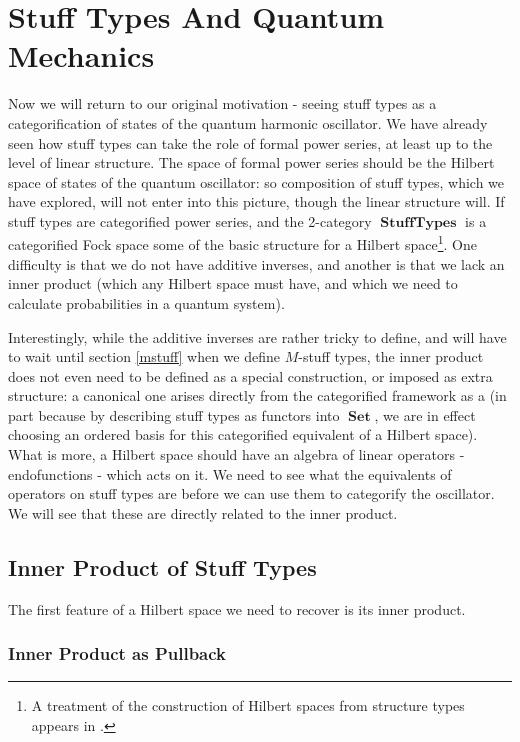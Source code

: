 \documentclass{amsart} \usepackage{amsmath,amssymb,bbm}
\newcommand{\opname}[1]{\operatorname{#1}}
\newcommand{\catname}[1]{\boldsymbol{\opname{{#1}}}}
\newcommand{\Set}{\catname{Set}}
\begin{document}
\section{Stuff Types And Quantum Mechanics} \label{stuff-quantum-sec}

Now we will return to our original motivation - seeing stuff types as
a categorification of states of the quantum harmonic oscillator.  We
have already seen how stuff types can take the role of formal power
series, at least up to the level of linear structure.  The space of
formal power series should be the Hilbert space of states of the
quantum oscillator: so composition of stuff types, which we have
explored, will not enter into this picture, though the linear
structure will.  If stuff types are categorified power series, and the
2-category $\catname{StuffTypes}$ is a categorified Fock space some of
the basic structure for a Hilbert space{\footnote{A treatment of the
construction of Hilbert spaces from structure types appears in
{\cite{maassen}}.}}.  One difficulty is that we do not have additive
inverses, and another is that we lack an inner product (which any
Hilbert space must have, and which we need to calculate probabilities
in a quantum system).

Interestingly, while the additive inverses are rather tricky to
define, and will have to wait until section \ref{mstuff} when we
define $M$-stuff types, the inner product does not even need to be
defined as a special construction, or imposed as extra structure: a
canonical one arises directly from the categorified framework as a (in
part because by describing stuff types as functors into $\Set$, we are
in effect choosing an ordered basis for this categorified equivalent
of a Hilbert space). What is more, a Hilbert space should have an
algebra of linear operators - endofunctions - which acts on it.  We
need to see what the equivalents of operators on stuff types are before
we can use them to categorify the oscillator.  We will see that these
are directly related to the inner product.

\subsection{Inner Product of Stuff Types} \label{stuffinnerprod}

The first feature of a Hilbert space we need to recover is its inner
product.

\subsubsection{Inner Product as Pullback}
\end{document}
